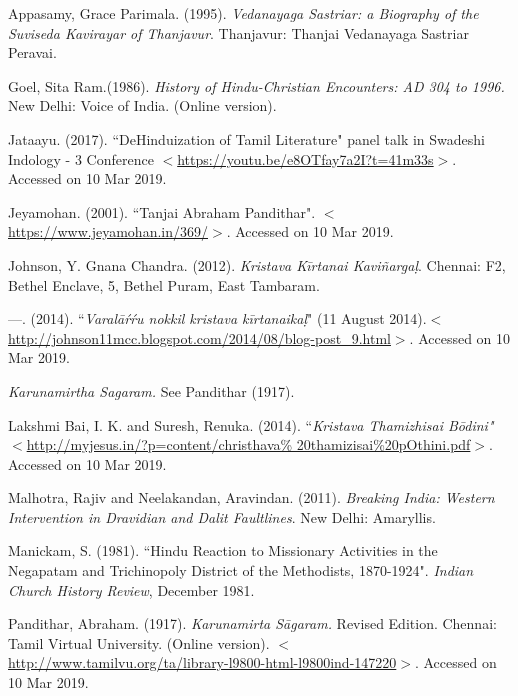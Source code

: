 \begin{thebibliography}{99}
\itemsep=0pt

  Appasamy, Grace Parimala. (1995). \textit{Vedanayaga Sastriar: a Biography of the Suviseda Kavirayar of Thanjavur}. Thanjavur: Thanjai Vedanayaga Sastriar Peravai.

  Goel, Sita Ram.(1986).\textit{ History of Hindu-Christian Encounters: AD 304 to 1996. }New Delhi: Voice of India. (Online version).

\newpage

  Jataayu. (2017). ``DeHinduization of Tamil Literature" panel talk in Swadeshi Indology - 3 Conference $<$\url{https://youtu.be/e8OTfay7a2I?t=41m33s}$>$. Accessed on 10 Mar 2019.

  Jeyamohan. (2001). ``Tanjai Abraham Pandithar". $<$\url{https://www.jeyamohan.in/369/}$>$. Accessed on 10 Mar 2019.

  Johnson, Y. Gnana Chandra. (2012).\textit{ Kristava Kīrtanai Kaviñargaḷ}. Chennai: F2, Bethel Enclave, 5, Bethel Puram, East Tambaram.

  —. (2014). ``\textit{Varalāŕŕu nokkil kristava kīrtanaikaḷ}" (11 August 2014).\break $<$\url{http://johnson11mcc.blogspot.com/2014/08/blog-post_9.html}$>$. Accessed on 10 Mar 2019.

  \textit{Karunamirtha Sagaram. }See Pandithar (1917).

  Lakshmi Bai, I. K. and Suresh, Renuka. (2014). ``\textit{Kristava Thamizhisai Bōdini"} $<$\url{http://myjesus.in/?p=content/christhava\% 20thamizisai\%20pOthini.pdf}$>$. Accessed on 10 Mar 2019.

  Malhotra, Rajiv and Neelakandan, Aravindan. (2011). \textit{Breaking India: Western Intervention in Dravidian and Dalit Faultlines}. New Delhi: Amaryllis.

  Manickam, S. (1981). ``Hindu Reaction to Missionary Activities in the Negapatam and Trichinopoly District of the Methodists, 1870-1924". \textit{Indian Church History Review}, December 1981.

  Pandithar, Abraham. (1917). \textit{Karunamirta Sāgaram. }Revised Edition. Chennai: Tamil Virtual University. (Online version). $<$\url{http://www.tamilvu.org/ta/library-l9800-html-l9800ind-147220}$>$. Accessed on 10 Mar 2019.


\end{thebibliography}
